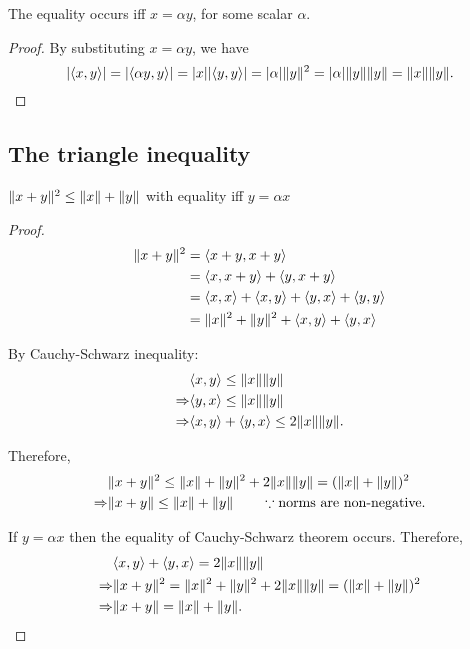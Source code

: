 The equality occurs iff $x = \alpha y$, for some scalar $\alpha$.
\begin{proof}
	By substituting $x = \alpha y$, we have
	\[\lvert \langle x, y \rangle \rvert = \lvert \langle \alpha y, y \rangle \rvert = \lvert x \rvert \lvert \langle y, y \rangle \rvert = \lvert \alpha \rvert \lVert y \rVert^2 = \lvert \alpha \rvert \lVert y \rVert \lVert y \rVert = \lVert x \rVert \lVert y \rVert.\]
\end{proof}

\subsection{The triangle inequality}
$\lVert x + y \rVert^2 \leq \lVert x \rVert + \lVert y \rVert$ with equality iff $y = \alpha x$
\begin{proof}
	\begin{align*}
		\lVert x + y \rVert^2 &= \langle x+y, x+y \rangle \\
		&= \langle x, x+y \rangle + \langle y, x+y \rangle\\
		&= \langle x, x \rangle + \langle x, y \rangle + \langle y, x \rangle + \langle y, y \rangle \\
		&= \lVert x \rVert^2 + \lVert y \rVert^2 + \langle x, y \rangle + \langle y, x \rangle
	\end{align*}
	
	By Cauchy-Schwarz inequality:
	\begin{align*}
		& \langle x, y \rangle \leq \lVert x \rVert \lVert y \rVert\\
		\Rightarrow & \langle y, x \rangle \leq \lVert x \rVert \lVert y \rVert\\
		\Rightarrow & \langle x, y \rangle + \langle y, x \rangle \leq 2\lVert x \rVert\lVert y \rVert.
	\end{align*}
	
	Therefore,
	\begin{align*}
		&\lVert x + y \rVert^2 \leq \lVert x \rVert + \lVert y \rVert^2 + 2\lVert x \rVert\lVert y \rVert = (\lVert x \rVert + \lVert y \rVert)^2 \\
		\Rightarrow & \lVert x + y \rVert \leq \lVert x \rVert + \lVert y \rVert \qquad \because \text{norms are non-negative.}
	\end{align*}
	
	If $y = \alpha x$ then the equality of Cauchy-Schwarz theorem occurs. Therefore,
	\begin{align*}
		&\langle x, y \rangle + \langle y, x \rangle = 2 \lVert x \rVert \lVert y \rVert \\
		\Rightarrow &\lVert x + y \rVert^2 = \lVert x \rVert^2 + \lVert y \rVert^2 + 2 \lVert x \rVert \lVert y \rVert = (\lVert x \rVert + \lVert y \rVert)^2 \\
		\Rightarrow & \lVert x + y \rVert = \lVert x \rVert + \lVert y \rVert.
	\end{align*}
\end{proof}


